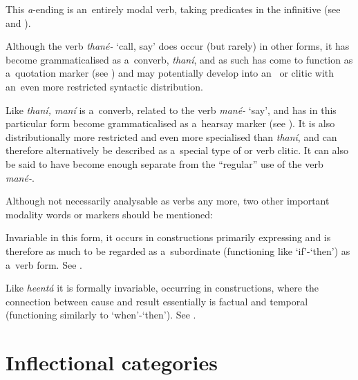  This \textit{a}-ending  is an~entirely modal verb, taking  predicates in the infinitive (see  and ).



 Although the verb \textit{thané-} `call, say' does occur (but rarely) in other forms, it has become grammaticalised as a~converb, \textit{thaní}, and as such has come to function as a~quotation marker (see ) and may potentially develop into an~ or clitic with an~even more restricted syntactic distribution.



 Like \textit{thaní, maní} is a~converb, related to the verb \textit{mané-} `say', and has in this particular form become grammaticalised as a~hearsay marker (see ). It is also distributionally more restricted and even more specialised than \textit{thaní}, and can therefore alternatively be described as a~special type of  or verb clitic. It can also be said to have become enough separate from the ``regular'' use of the verb \textit{mané-}.



Although not necessarily analysable as verbs any more, two other important modality words or markers should be mentioned:



 Invariable in this form, it occurs in constructions primarily expressing  and is therefore as much to be regarded as a~subordinate  (functioning like `if'-`then') as a~verb form. See .



 Like \textit{heentá} it is formally invariable, occurring in  constructions, where the connection between cause and result essentially is factual and temporal (functioning similarly to `when'-`then'). See .


\section{Inflectional categories}
\label{sec:8-4}

